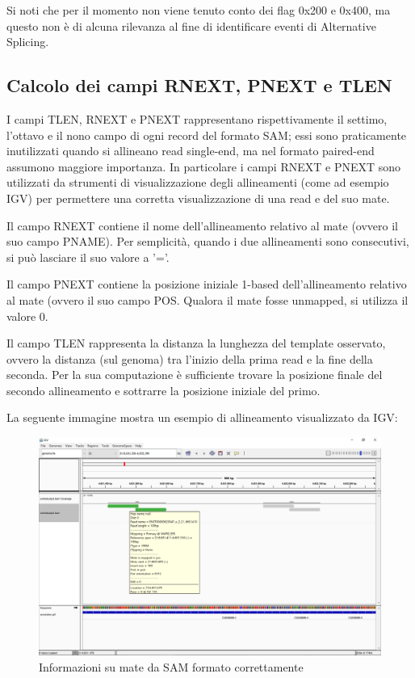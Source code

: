 Si noti che per il momento non viene tenuto conto dei flag 0x200 e 0x400, ma questo non è di alcuna rilevanza al fine di identificare eventi di Alternative Splicing.

\newpage

\subsection{Calcolo dei campi RNEXT, PNEXT e TLEN}
I campi TLEN, RNEXT e PNEXT rappresentano rispettivamente il settimo, l'ottavo e il nono campo di ogni record del formato SAM; essi sono praticamente inutilizzati quando si allineano read single-end, ma nel formato paired-end assumono maggiore importanza. In particolare i campi RNEXT e PNEXT sono utilizzati da strumenti di visualizzazione degli allineamenti (come ad esempio IGV) per permettere una corretta visualizzazione di una read e del suo mate.

Il campo RNEXT contiene il nome dell'allineamento relativo al mate (ovvero il suo campo PNAME). Per semplicità, quando i due allineamenti sono consecutivi, si può lasciare il suo valore a '='.

Il campo PNEXT contiene la posizione iniziale 1-based dell'allineamento relativo al mate (ovvero il suo campo POS. Qualora il mate fosse unmapped, si utilizza il valore 0.

Il campo TLEN rappresenta la distanza la lunghezza del template osservato, ovvero la distanza (sul genoma) tra l'inizio della prima read e la fine della seconda. Per la sua computazione è sufficiente trovare la posizione finale del secondo allineamento e sottrarre la posizione iniziale del primo.

La seguente immagine mostra un esempio di allineamento visualizzato da IGV:

\begin{figure}[h]
	\centering
	\includegraphics[width=\linewidth]{images/mateinfo.png}
  \caption{Informazioni su mate da SAM formato correttamente}
  \label{fig:Mate info}
\end{figure}

